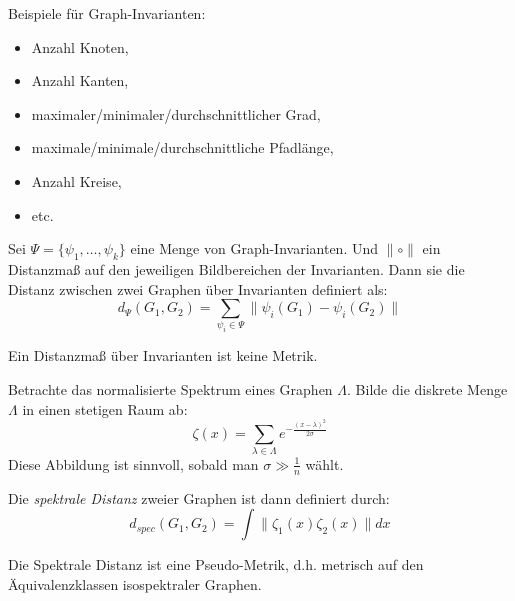 \begin{example}
    Beispiele für Graph-Invarianten:
    \begin{itemize}
        \item Anzahl Knoten,
        \item Anzahl Kanten,
        \item maximaler/minimaler/durchschnittlicher Grad,
        \item maximale/minimale/durchschnittliche Pfadlänge,
        \item Anzahl Kreise,
        \item etc.
    \end{itemize}
\end{example}

\begin{definition}
    Sei $ \Psi = \{ \psi_1, \dots, \psi_k \} $ eine Menge von Graph-Invarianten.
    Und $ \| \circ \| $ ein Distanzmaß auf den jeweiligen Bildbereichen der Invarianten.
    Dann sie die Distanz zwischen zwei Graphen über Invarianten definiert als:
    \begin{equation*}
        d_\Psi(G_1, G_2) = \sum_{\psi_i \in \Psi} \| \psi_i(G_1) - \psi_i(G_2) \|
    \end{equation*}
\end{definition}

\begin{remark}
    Ein Distanzmaß über Invarianten ist keine Metrik.
\end{remark}

\begin{definition}
    Betrachte das normalisierte Spektrum eines Graphen $ \Lambda $.
    Bilde die diskrete Menge $ \Lambda $ in einen stetigen Raum ab:
    \begin{equation*}
        \zeta(x) = \sum_{\lambda \in \Lambda} e^{-\frac{(x - \lambda)^2}{2\sigma}}
    \end{equation*}
    Diese Abbildung ist sinnvoll, sobald man $ \sigma \gg \frac{1}{n} $ wählt.

    Die \textit{spektrale Distanz} zweier Graphen ist dann definiert durch:
    \begin{equation*}
        d_{spec}(G_1, G_2) = \int \| \zeta_1(x) \zeta_2(x) \| dx
    \end{equation*}
\end{definition}

\begin{remark}
    Die Spektrale Distanz ist eine Pseudo-Metrik, d.h. metrisch auf den Äquivalenzklassen isospektraler Graphen.
\end{remark}
